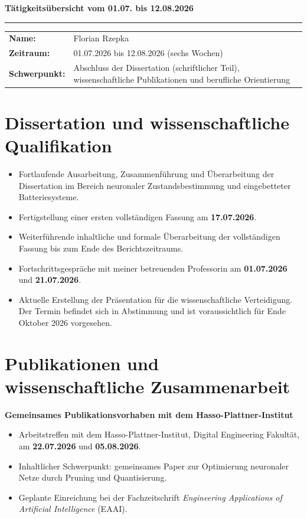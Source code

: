 \documentclass[10pt,a4paper]{scrartcl}
\begin{document}
{\Large\bfseries\color{tured} Tätigkeitsübersicht vom 01.07. bis 12.08.2026}\par
\vspace{4pt}
\rule{\textwidth}{1.2pt}
\vspace{5pt}

\begin{tabularx}{\textwidth}{@{}lX@{}}
\textbf{Name:} & Florian Rzepka \\
\textbf{Zeitraum:} & 01.07.2026 bis 12.08.2026 (sechs Wochen) \\
\textbf{Schwerpunkt:} & Abschluss der Dissertation (schriftlicher Teil), wissenschaftliche Publikationen und berufliche Orientierung
\end{tabularx}

\section*{Dissertation und wissenschaftliche Qualifikation}
\begin{itemize}
    \item Fortlaufende Ausarbeitung, Zusammenführung und Überarbeitung der Dissertation im Bereich neuronaler Zustandsbestimmung und eingebetteter Batteriesysteme.
    \item Fertigstellung einer ersten vollständigen Fassung am \textbf{17.07.2026}.
    \item Weiterführende inhaltliche und formale Überarbeitung der vollständigen Fassung bis zum Ende des Berichtszeitraums.
    \item Fortschrittsgespräche mit meiner betreuenden Professorin am \textbf{01.07.2026} und \textbf{21.07.2026}.
    \item Aktuelle Erstellung der Präsentation für die wissenschaftliche Verteidigung. Der Termin befindet sich in Abstimmung und ist voraussichtlich für Ende Oktober 2026 vorgesehen.
\end{itemize}

\section*{Publikationen und wissenschaftliche Zusammenarbeit}
\textbf{Gemeinsames Publikationsvorhaben mit dem Hasso-Plattner-Institut}
\begin{itemize}
    \item Arbeitstreffen mit dem Hasso-Plattner-Institut, Digital Engineering Fakultät, am \textbf{22.07.2026} und \textbf{05.08.2026}.
    \item Inhaltlicher Schwerpunkt: gemeinsames Paper zur Optimierung neuronaler Netze durch Pruning und Quantisierung.
    \item Geplante Einreichung bei der Fachzeitschrift \emph{Engineering Applications of Artificial Intelligence} (EAAI).
\end{itemize}
\end{document}
